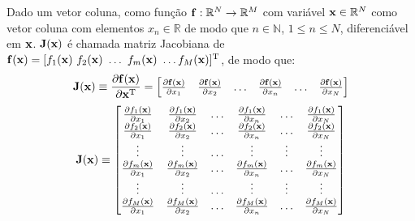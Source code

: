 \begin{proposition}\label{def:jacobian}
 Dado um vetor coluna, como função $\VECTOR{f}:\mathbb{R}^{N}\rightarrow \mathbb{R}^{M}$ com variável $\VECTOR{x} \in \mathbb{R}^{N}$
 como vetor coluna com elementos $x_n\in \mathbb{R}$ de modo que $n\in \mathbb{N}$, $1 \leq n \leq N$,
 diferenciável em $\VECTOR{x}$. 
 $\MATRIX{J}(\VECTOR{x})$ é chamada matriz Jacobiana \cite[pp. 130]{zhang2017matrix} \cite{Jacobian}  de 
 $\VECTOR{f}(\VECTOR{x})=[f_1(\VECTOR{x})~f_2(\VECTOR{x})~\dots~f_m(\VECTOR{x})~\dots f_M(\VECTOR{x})]^{\transpose}$, de modo que: 
 \begin{equation}
  \MATRIX{J}(\VECTOR{x})\equiv \frac{\partial \VECTOR{f}(\VECTOR{x})}{\partial \VECTOR{x}^{\transpose} }=
\left[
\begin{matrix}
\frac{\partial \VECTOR{f}(\VECTOR{x}) }{\partial x_{1}}&
\frac{\partial \VECTOR{f}(\VECTOR{x}) }{\partial x_{2}}&
\hdots&
\frac{\partial \VECTOR{f}(\VECTOR{x}) }{\partial x_{n}}&
\hdots&
\frac{\partial \VECTOR{f}(\VECTOR{x}) }{\partial x_{N}}
\end{matrix}
\right]
 \end{equation}
  \begin{equation}
  \MATRIX{J}(\VECTOR{x})\equiv 
\left[
\begin{matrix}
\frac{\partial f_1(\VECTOR{x}) }{\partial x_{1}}&
\frac{\partial f_1(\VECTOR{x}) }{\partial x_{2}}&
\hdots&
\frac{\partial f_1(\VECTOR{x}) }{\partial x_{n}}&
\hdots&
\frac{\partial f_1(\VECTOR{x}) }{\partial x_{N}}\\
\frac{\partial f_2(\VECTOR{x}) }{\partial x_{1}}&
\frac{\partial f_2(\VECTOR{x}) }{\partial x_{2}}&
\hdots&
\frac{\partial f_2(\VECTOR{x}) }{\partial x_{n}}&
\hdots&
\frac{\partial f_2(\VECTOR{x}) }{\partial x_{N}}\\
\vdots&
\vdots&
\hdots&
\vdots&
\vdots&
\vdots\\
\frac{\partial f_m(\VECTOR{x}) }{\partial x_{1}}&
\frac{\partial f_m(\VECTOR{x}) }{\partial x_{2}}&
\hdots&
\frac{\partial f_m(\VECTOR{x}) }{\partial x_{n}}&
\hdots&
\frac{\partial f_m(\VECTOR{x}) }{\partial x_{N}}\\
\vdots&
\vdots&
\hdots&
\vdots&
\vdots&
\vdots\\
\frac{\partial f_M(\VECTOR{x}) }{\partial x_{1}}&
\frac{\partial f_M(\VECTOR{x}) }{\partial x_{2}}&
\hdots&
\frac{\partial f_M(\VECTOR{x}) }{\partial x_{n}}&
\hdots&
\frac{\partial f_M(\VECTOR{x}) }{\partial x_{N}}\\
\end{matrix}
\right]
 \end{equation}
\end{proposition}

